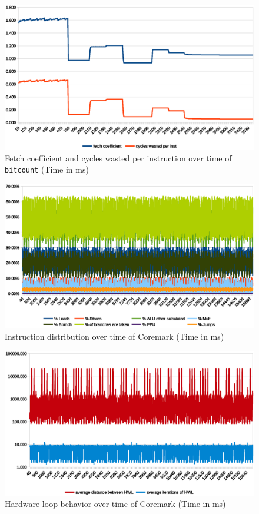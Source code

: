 \documentclass[../bachelor_paper.tex]{subfiles}
\begin{document}
\begin{figure}
    \centering
    \includegraphics[width=\textwidth]{img/graph/mibench/bitcount_fetch_waste.eps}
    \caption{Fetch coefficient and cycles wasted per instruction over time of \texttt{bitcount} (Time in ms)}
    \label{fig:res/bitcount/fetch_waste}
\end{figure}

\begin{figure}
    \centering
    \includegraphics[width=\textwidth]{img/graph/coremark/coremark_inst.eps}
    \caption{Instruction distribution over time of Coremark (Time in ms)}
    \label{fig:res/coremark/inst}
\end{figure}

\begin{figure}
    \centering
    \includegraphics[width=\textwidth]{img/graph/coremark/coremark_hwl.eps}
    \caption{Hardware loop behavior over time of Coremark (Time in ms)}
    \label{fig:res/coremark/hwl}
\end{figure}
\end{document}
